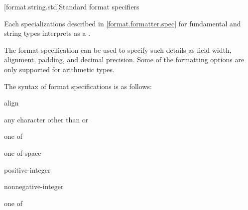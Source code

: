 [format.string.std]{Standard format specifiers}

\pnum
Each  specializations
described in \ref{format.formatter.spec}
for fundamental and string types
interprets  as a
.
\begin{note}
The format specification can be used to specify such details as
field width, alignment, padding, and decimal precision.
Some of the formatting options
are only supported for arithmetic types.
\end{note}
The syntax of format specifications is as follows:

\begin{ncbnf}
\br
      \opt{\terminal{\#}}     
\end{ncbnf}

\begin{ncbnf}
\br
     align
\end{ncbnf}

\begin{ncbnf}
\br
    \textnormal{any character other than \tcode{\{} or \tcode{\}}}
\end{ncbnf}

\begin{ncbnf}
 \textnormal{one of}\br
    \terminal{< > \caret}
\end{ncbnf}

\begin{ncbnf}
 \textnormal{one of}\br
    \terminal{+ -} \textnormal{space}
\end{ncbnf}

\begin{ncbnf}
\br
    positive-integer\br
    \terminal{\{}  \terminal{\}}
\end{ncbnf}

\begin{ncbnf}
\br
     nonnegative-integer\br
     \terminal{\{}  \terminal{\}}
\end{ncbnf}

\begin{ncbnf}
 \textnormal{one of}\br
\end{ncbnf}

